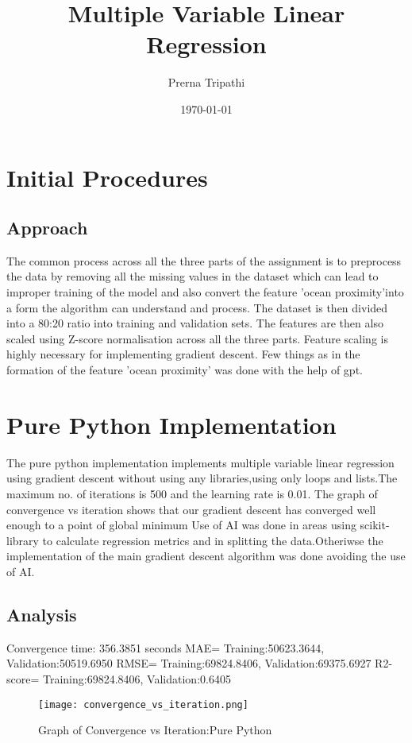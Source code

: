 \documentclass[12pt]{article}
\title{Multiple Variable Linear Regression}
\author{Prerna Tripathi}
\date{\today}
\begin{document}
\maketitle
\onehalfspacing

\section{Initial Procedures}
\subsection{Approach}
The common process across all the three parts of the assignment is to preprocess the data by removing all the missing values in the dataset which can lead to improper training of the model and also convert the feature 'ocean proximity'into a form the algorithm can understand and process.
The dataset is then divided into a 80:20 ratio into training and validation sets. The features are then also scaled using Z-score normalisation across all the three parts. Feature scaling is highly necessary for implementing gradient descent.
Few things as in the formation of the feature 'ocean proximity' was done with the help of gpt.
\section{Pure Python Implementation}
The pure python implementation implements multiple variable linear regression using gradient descent without using any libraries,using only loops and lists.The maximum no. of iterations is 500 and the learning rate is 0.01. The graph of convergence vs iteration shows that our gradient descent has converged well enough to a point of global minimum
Use of AI was done in areas using scikit-library to calculate regression metrics and in splitting the data.Otheriwse the implementation of the main gradient descent algorithm was done avoiding the use of AI.
\subsection{Analysis}
Convergence time: 356.3851 seconds
MAE= Training:50623.3644, Validation:50519.6950
RMSE= Training:69824.8406, Validation:69375.6927
R2-score= Training:69824.8406, Validation:0.6405
\begin{figure}[h]
    \centering
    \texttt{[image: convergence\_vs\_iteration.png]}
    \caption{Graph of Convergence vs Iteration:Pure Python}
    \label{fig:Convergence vs Iteration}
\end{figure}
\end{document}
